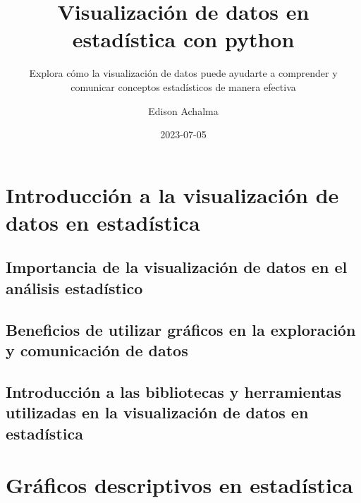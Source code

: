 \documentclass[
  a4paper,
]{article}
\title{Visualización de datos en estadística con python}
\subtitle{Explora cómo la visualización de datos puede ayudarte a
comprender y comunicar conceptos estadísticos de manera efectiva}
\author{Edison Achalma}
\date{2023-07-05}
\begin{document}
\maketitle
\ifdefined\Shaded\renewenvironment{Shaded}{\begin{tcolorbox}[frame hidden, sharp corners, interior hidden, borderline west={3pt}{0pt}{shadecolor}, enhanced, breakable, boxrule=0pt]}{\end{tcolorbox}}\fi

\hypertarget{introducciuxf3n-a-la-visualizaciuxf3n-de-datos-en-estaduxedstica}{%
\section{Introducción a la visualización de datos en
estadística}\label{introducciuxf3n-a-la-visualizaciuxf3n-de-datos-en-estaduxedstica}}

\hypertarget{importancia-de-la-visualizaciuxf3n-de-datos-en-el-anuxe1lisis-estaduxedstico}{%
\subsection{Importancia de la visualización de datos en el análisis
estadístico}\label{importancia-de-la-visualizaciuxf3n-de-datos-en-el-anuxe1lisis-estaduxedstico}}

\hypertarget{beneficios-de-utilizar-gruxe1ficos-en-la-exploraciuxf3n-y-comunicaciuxf3n-de-datos}{%
\subsection{Beneficios de utilizar gráficos en la exploración y
comunicación de
datos}\label{beneficios-de-utilizar-gruxe1ficos-en-la-exploraciuxf3n-y-comunicaciuxf3n-de-datos}}

\hypertarget{introducciuxf3n-a-las-bibliotecas-y-herramientas-utilizadas-en-la-visualizaciuxf3n-de-datos-en-estaduxedstica}{%
\subsection{Introducción a las bibliotecas y herramientas utilizadas en
la visualización de datos en
estadística}\label{introducciuxf3n-a-las-bibliotecas-y-herramientas-utilizadas-en-la-visualizaciuxf3n-de-datos-en-estaduxedstica}}

\hypertarget{gruxe1ficos-descriptivos-en-estaduxedstica}{%
\section{Gráficos descriptivos en
estadística}\label{gruxe1ficos-descriptivos-en-estaduxedstica}}
\end{document}
